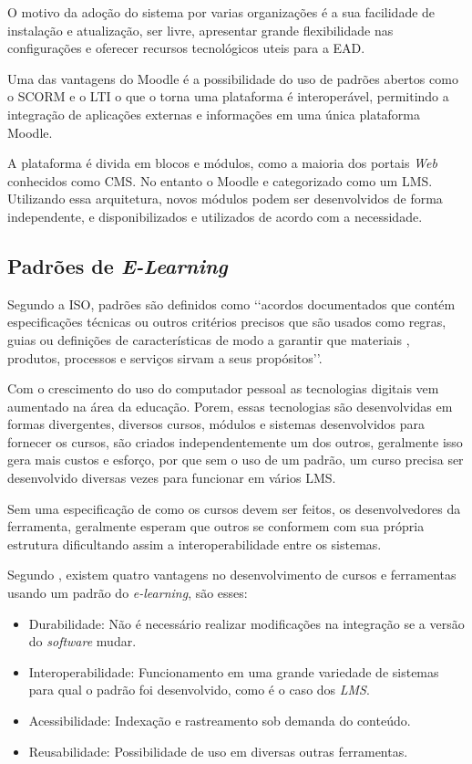 O motivo da adoção do sistema por varias organizações é a sua facilidade de instalação e atualização, ser livre, apresentar grande flexibilidade nas configurações e oferecer recursos tecnológicos uteis para a EAD.

Uma das vantagens do \ac{Moodle} é a possibilidade do uso de padrões abertos como o \ac{SCORM} e o \ac{LTI} o que o torna uma plataforma é interoperável, permitindo a integração de aplicações externas e informações em uma única plataforma \ac{Moodle}.

A plataforma é divida em blocos e módulos, como a maioria dos portais \textit{Web} conhecidos como \ac{CMS}. No entanto o \ac{Moodle} e categorizado como um \ac{LMS}. Utilizando essa arquitetura, novos módulos podem ser desenvolvidos de forma independente, e disponibilizados e utilizados de acordo com a necessidade.

\subsection{Padrões de \textit{E-Learning}}
Segundo a ISO, padrões são definidos como \lq\lq acordos documentados que contém especificações técnicas ou outros critérios precisos que são usados como regras, guias ou definições de características de modo a garantir que materiais , produtos, processos e serviços sirvam a seus propósitos\rq\rq.

Com o crescimento do uso do computador pessoal as tecnologias digitais vem aumentado na área da educação. Porem, essas tecnologias são desenvolvidas em formas divergentes, diversos cursos, módulos e sistemas desenvolvidos para fornecer os cursos, são criados independentemente um dos outros, geralmente isso gera mais custos e esforço, por que sem o uso de um padrão, um curso precisa ser desenvolvido diversas vezes para funcionar em vários \ac{LMS}.

Sem uma especificação de como os cursos devem ser feitos, os desenvolvedores da ferramenta, geralmente esperam que outros se conformem com sua própria estrutura dificultando assim a interoperabilidade entre os sistemas.

Segundo , existem quatro vantagens no desenvolvimento de cursos e ferramentas usando um padrão do \textit{e-learning}, são esses:
\begin{itemize}
  \item Durabilidade: Não é necessário realizar modificações na integração se a versão do \textit{software} mudar.
  \item Interoperabilidade: Funcionamento em uma grande variedade de sistemas para qual o padrão foi desenvolvido, como é o caso dos \textit{LMS}.
  \item Acessibilidade: Indexação e rastreamento sob demanda do conteúdo.
  \item Reusabilidade: Possibilidade de uso em diversas outras ferramentas.
\end{itemize}

